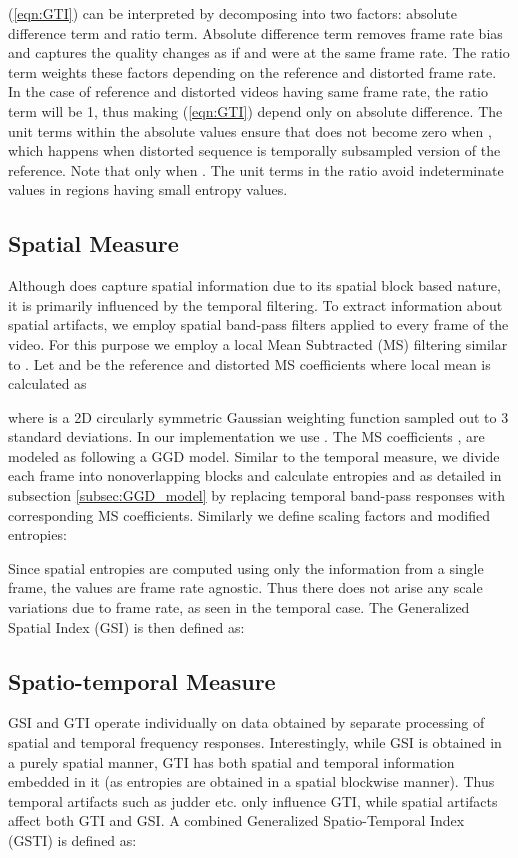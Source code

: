 \documentclass[journal]{IEEEtran}
\begin{document}
(\ref{eqn:GTI}) can be interpreted by decomposing into two factors: absolute difference term and ratio term. Absolute difference term removes frame rate bias and captures the quality changes as if  and  were at the same frame rate. The ratio term weights these factors depending on the reference and distorted frame rate. In the case of reference and distorted videos having same frame rate, the ratio term will be 1, thus making (\ref{eqn:GTI}) depend only on absolute difference. The unit terms within the absolute values ensure that  does not become zero when , which happens when distorted sequence is temporally subsampled version of the reference. Note that  only when . The unit terms in the ratio avoid indeterminate values in regions having small entropy values.

\vspace{-7pt}
\subsection{Spatial Measure}
Although  does capture spatial information due to its spatial block based nature, it is primarily influenced by the temporal filtering. To extract information about spatial artifacts, we employ spatial band-pass filters applied to every frame of the video. For this purpose we employ a local Mean Subtracted (MS) filtering similar to \cite{bampis2017speed}. Let  and  be the reference and distorted MS coefficients where local mean is calculated as

where  is a 2D
circularly symmetric Gaussian weighting function sampled out to 3 standard deviations. In our implementation we use . The MS coefficients ,  are modeled as following a GGD model. Similar to the temporal measure, we divide each frame into  nonoverlapping blocks and calculate entropies  and  as detailed in subsection \ref{subsec:GGD_model} by replacing temporal band-pass responses with corresponding MS coefficients. Similarly we define scaling factors and modified entropies:

Since spatial entropies are computed using only the information from a single frame, the values are frame rate agnostic. Thus there does not arise any scale variations due to frame rate, as seen in the temporal case. The Generalized Spatial Index (GSI) is then defined as:


\vspace{-7pt}
\subsection{Spatio-temporal Measure}
GSI and GTI operate individually on data obtained by separate processing of spatial and temporal frequency responses. Interestingly, while GSI is obtained in a purely spatial manner, GTI has both spatial and temporal information embedded in it (as entropies are obtained in a spatial blockwise manner). Thus temporal artifacts such as judder etc. only influence GTI, while spatial artifacts affect both GTI and GSI. A combined Generalized Spatio-Temporal Index (GSTI) is defined as:
\end{document}
